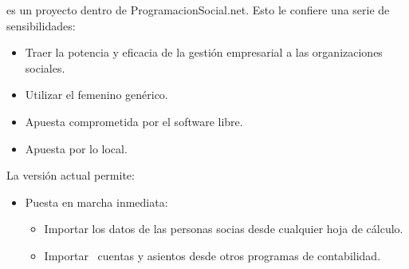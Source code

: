 \appname es un proyecto dentro de ProgramacionSocial.net. Esto le confiere
una serie de sensibilidades:

\begin{itemize}
 \item Traer la potencia y eficacia de la gestión empresarial a las organizaciones sociales.
 \item Utilizar el femenino genérico.
 \item Apuesta comprometida por el software libre.
 \item Apuesta por lo local.
\end{itemize}


La versión actual permite:

\liststyleLi
\begin{itemize}
\item Puesta en marcha inmediata:

\begin{itemize}
\item Importar los datos de las personas socias desde cualquier hoja de
cálculo.
\item Importar \ cuentas y asientos desde otros programas de
contabilidad.
\end{itemize}
\end{itemize}
\liststyleLii
